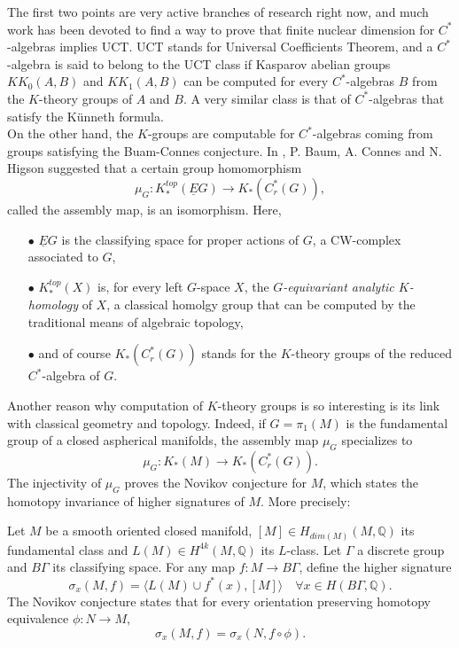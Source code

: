 The first two points are very active branches of research right now, and much work has been devoted to find a way to prove that finite nuclear dimension for $C^*$-algebras implies UCT. UCT stands for Universal Coefficients Theorem, and a $C^*$-algebra is said to belong to the UCT class if Kasparov abelian groups $KK_0(A,B)$ and $KK_1(A,B)$ can be computed for every $C^*$-algebras $B$ from the $K$-theory groups of $A$ and $B$. A very similar class is that of $C^*$-algebras that satisfy the K\"unneth formula. \\

On the other hand, the $K$-groups are computable for $C^*$-algebras coming from groups satisfying the Buam-Connes conjecture. In \cite{BCH84}, P. Baum, A. Connes and N. Higson suggested that a certain group homomorphism
\[\mu_G : K_*^{top}(\underline E G) \rightarrow K_*(C_r^*(G)), \]
called the assembly map, is an isomorphism. Here, 
\begin{itemize}
\item[$\bullet$] $\underline E G$ is the classifying space for proper actions of $G$, a CW-complex associated to $G$,
\item[$\bullet$] $K_*^{top}(X)$ is, for every left $G$-space $X$, the \textit{$G$-equivariant analytic $K$-homology} of $X$, a classical homolgy group that can be computed by the traditional means of algebraic topology,
\item[$\bullet$] and of course $K_*(C_r^*(G))$ stands for the $K$-theory groups of the reduced $C^*$-algebra of $G$. 
\end{itemize}

Another reason why computation of $K$-theory groups is so interesting is its link with classical geometry and topology. Indeed, if $G=\pi_1(M)$ is the fundamental group of a closed aspherical manifolds, the assembly map $\mu_G$ specializes to 
\[\mu_G : K_*(M)\rightarrow K_*(C^*_r(G)).\]
The injectivity of $\mu_G$ proves the Novikov conjecture for $M$, which states the homotopy invariance of higher signatures of $M$. More precisely:

\begin{conjecture} Let $M$ be a smooth oriented closed manifold, 
$[M]\in H_{dim(M)}(M,\mathbb Q)$ its fundamental class and
$ L(M)\in H^{4k}(M,\mathbb Q)$ its $L$-class. Let $\Gamma$ a discrete group and $B\Gamma$ its classifying space. 
For any map $f: M \rightarrow B\Gamma$, define the higher signature 
\[\sigma_x(M,f) = \langle L(M)\cup f^*(x),[M] \rangle \quad \forall x \in H(B\Gamma, \mathbb Q).\]
The Novikov conjecture states that for every orientation preserving homotopy equivalence $\phi : N\rightarrow M$,
\[\sigma_x(M,f)= \sigma_x(N,f\circ \phi).\]
\end{conjecture}

